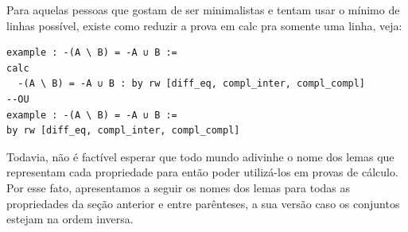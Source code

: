 Para aquelas pessoas que gostam de ser minimalistas e tentam usar o mínimo de linhas possível, existe como reduzir a prova em {\selectfont calc} pra somente uma linha, veja:

\begin{lstlisting}
example : -(A \ B) = -A ∪ B :=
calc
  -(A \ B) = -A ∪ B : by rw [diff_eq, compl_inter, compl_compl]
--OU
example : -(A \ B) = -A ∪ B :=
by rw [diff_eq, compl_inter, compl_compl] \end{lstlisting}

Todavia, não é factível esperar que todo mundo adivinhe o nome dos lemas que representam cada propriedade para então poder utilizá-los em provas de cálculo. Por esse fato, apresentamos a seguir os nomes dos lemas para todas as propriedades da seção anterior e entre parênteses, a sua versão caso os conjuntos estejam na ordem inversa.

